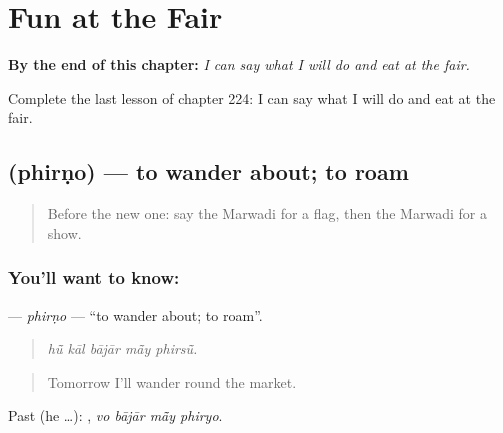 
\chapter{Fun at the Fair}
\label{ch:mw-fun-at-the-fair}

\begin{chapteropening}
\textbf{By the end of this chapter:} \emph{I can say what I will do and eat at the fair.}

Complete the last lesson of chapter 224: I can say what I will do and eat at the fair.
\end{chapteropening}

\section[\texorpdfstring{\mw{फिरणो} (phirṇo)}{फिरणो (phirṇo)}]{ (phirṇo) — to wander about; to roam}

\label{lesson:MW-C224-phirno}



\begin{quote}
Before the new one: say the Marwadi for a flag, then the Marwadi for a show.
\end{quote}

\subsection*{You'll want to know: }
\textbf{} — \emph{phirṇo} — \textquotedblleft{}to wander about; to roam\textquotedblright{}.

\begin{quote}
    
\end{quote}

\begin{quote}
\emph{hū̃ kāl bājār mā̃y phirsū̃.}
\end{quote}

\begin{quote}
Tomorrow I'll wander round the market.
\end{quote}

Past (he …):    , \emph{vo bājār mā̃y phiryo}.


